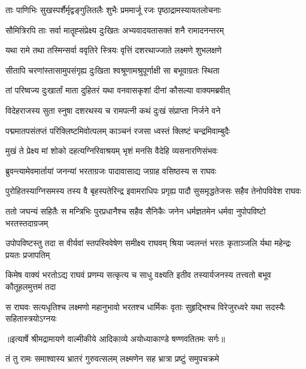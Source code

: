 \twolineshloka
{ताः पाणिभिः सुखस्पर्शैर्मृद्वङ्गुलितलैः शुभैः}
{प्रममार्जू रजः पृष्ठाद्रामस्यायतलोचनाः} %

\twolineshloka
{सौमित्रिरपि ताः सर्वा मातॄह्संप्रेक्ष्य दुःखितः}
{अभ्यवादयतासक्तं शनै रामादनन्तरम्} %

\twolineshloka
{यथा रामे तथा तस्मिन्सर्वा ववृतिरे स्त्रियः}
{वृत्तिं दशरथाज्जाते लक्ष्मणे शुभलक्षणे} %

\twolineshloka
{सीतापि चरणांस्तासामुपसंगृह्य दुःखिता}
{श्वश्रूणामश्रुपूर्णाक्षी सा बभूवाग्रतः स्थिता} %

\twolineshloka
{तां परिष्वज्य दुःखार्तां माता दुहितरं यथा}
{वनवासकृशां दीनां कौसल्या वाक्यमब्रवीत्} %

\twolineshloka
{विदेहराजस्य सुता स्नुषा दशरथस्य च}
{रामपत्नी कथं दुःखं संप्राप्ता निर्जने वने} %

\twolineshloka
{पद्ममातपसंतप्तं परिक्लिष्टमिवोत्पलम्}
{काञ्चनं रजसा ध्वस्तं क्लिष्टं चन्द्रमिवाम्बुदैः} %

\twolineshloka
{मुखं ते प्रेक्ष्य मां शोको दहत्यग्निरिवाश्रयम्}
{भृशं मनसि वैदेहि व्यसनारणिसंभवः} %

\twolineshloka
{ब्रुवन्त्यामेवमार्तायां जनन्यां भरताग्रजः}
{पादावासाद्य जग्राह वसिष्ठस्य स राघवः} %

\fourlineindentedshloka
{पुरोहितस्याग्निसमस्य तस्य वै}
{ बृहस्पतेरिन्द्र इवामराधिपः}
{प्रगृह्य पादौ सुसमृद्धतेजसः}
{ सहैव तेनोपविवेश राघवः} %

\fourlineindentedshloka
{ततो जघन्यं सहितैः स मन्त्रिभिः}
{ पुरप्रधानैश्च सहैव सैनिकैः}
{जनेन धर्मज्ञतमेन धर्मवा}
{नुपोपविष्टो भरतस्तदाग्रजम्} %

\fourlineindentedshloka
{उपोपविष्टस्तु तदा स वीर्यवां}
{स्तपस्विवेषेण समीक्ष्य राघवम्}
{श्रिया ज्वलन्तं भरतः कृताञ्जलि}
{र्यथा महेन्द्रः प्रयतः प्रजापतिम्} %

\fourlineindentedshloka
{किमेष वाक्यं भरतोऽद्य राघवं}
{ प्रणम्य सत्कृत्य च साधु वक्ष्यति}
{इतीव तस्यार्यजनस्य तत्त्वतो}
{ बभूव कौतूहलमुत्तमं तदा} %

\fourlineindentedshloka
{स राघवः सत्यधृतिश्च लक्ष्मणो}
{ महानुभावो भरतश्च धार्मिकः}
{वृताः सुहृद्भिश्च विरेजुरध्वरे}
{ यथा सदस्यैः सहितास्त्रयोऽग्नयः} %


{॥इत्यार्षे श्रीमद्रामायणे वाल्मीकीये आदिकाव्ये अयोध्याकाण्डे षण्णवतितमः सर्गः॥}


\twolineshloka
{तं तु रामः समाश्वास्य भ्रातरं गुरुवत्सलम्}
{लक्ष्मणेन सह भ्रात्रा प्रष्टुं समुपचक्रमे} %

